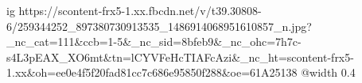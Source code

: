  
 
 
 
 

\ifcmt
  ig https://scontent-frx5-1.xx.fbcdn.net/v/t39.30808-6/259344252_897380730913535_1486914068951610857_n.jpg?_nc_cat=111&ccb=1-5&_nc_sid=8bfeb9&_nc_ohc=7h7c-s4L3pEAX_XO6mt&tn=lCYVFeHcTIAFcAzi&_nc_ht=scontent-frx5-1.xx&oh=ee0e4f5f20fad81cc7c686e95850f288&oe=61A25138
  @width 0.4
\fi
